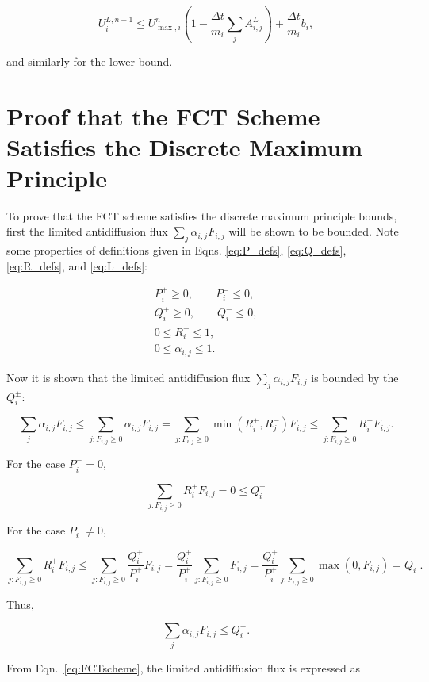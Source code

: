 \[
   U_i^{L,n+1} \le
   U_{\max,i}^n\left(1-\frac{\Delta t}{m_i}\sum\limits_j A^L_{i,j}\right)
      + \frac{\Delta t}{m_i}b_i,
\]

\noindent
and similarly for the lower bound.

\section{Proof that the FCT Scheme Satisfies the Discrete Maximum Principle}
\label{ap:fct_dmp}

To prove that the FCT scheme satisfies the discrete maximum principle bounds,
first the limited antidiffusion flux $\sum\limits_j \alpha_{i,j}F_{i,j}$
will be shown to be bounded. Note some properties of definitions given in Eqns. \ref{eq:P_defs},
\ref{eq:Q_defs}, \ref{eq:R_defs}, and \ref{eq:L_defs}:

\begin{gather*}
   P_i^+ \geq 0, \qquad P_i^- \leq 0,\\
   Q_i^+ \geq 0, \qquad Q_i^- \leq 0,\\
   0 \leq R_i^\pm \leq 1,\\
   0 \leq \alpha_{i,j} \leq 1.
\end{gather*}

\noindent
Now it is shown that the limited antidiffusion flux $\sum\limits_j \alpha_{i,j}F_{i,j}$ is bounded by the $Q_i^\pm$:

\[
   \sum\limits_j \alpha_{i,j}F_{i,j}
      \leq \sum\limits_{j:F_{i,j}\geq 0} \alpha_{i,j}F_{i,j}
      = \sum\limits_{j:F_{i,j}\geq 0} \min(R_i^+,R_j^-)F_{i,j}
      \leq \sum\limits_{j:F_{i,j}\geq 0} R_i^+ F_{i,j}.
\]

\noindent
For the case $P_i^+ = 0$,

\[
   \sum\limits_{j:F_{i,j}\geq 0} R_i^+ F_{i,j} = 0 \leq Q_i^+
\]

\noindent
For the case $P_i^+ \ne 0$,

\[
   \sum\limits_{j:F_{i,j}\geq 0} R_i^+ F_{i,j}
   \leq \sum\limits_{j:F_{i,j}\geq 0}\frac{Q_i^+}{P_i^+} F_{i,j}
   = \frac{Q_i^+}{P_i^+} \sum\limits_{j:F_{i,j}\geq 0} F_{i,j}
   = \frac{Q_i^+}{P_i^+} \sum\limits_{j:F_{i,j}\geq 0} \max(0,F_{i,j})
   = Q_i^+.
\]

\noindent
Thus,

\[
   \sum\limits_j \alpha_{i,j}F_{i,j} \leq Q_i^+.
\]

\noindent
From Eqn.~\ref{eq:FCTscheme}, the limited antidiffusion flux is expressed as

